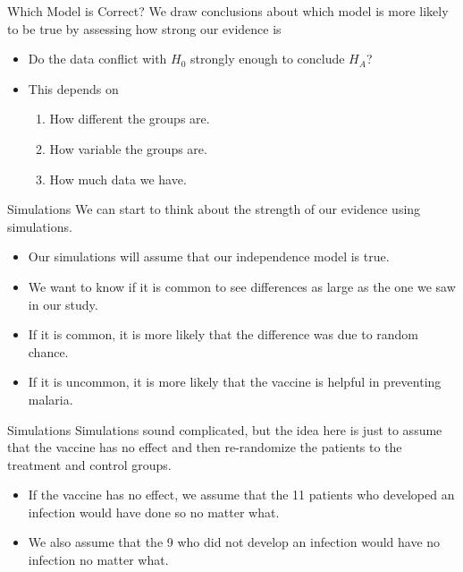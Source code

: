 \begin{frame}{Which Model is Correct?}
    We draw conclusions about which model is more likely to be true by assessing how strong our evidence is
    \begin{itemize}
        \item Do the data conflict with $H_0$ strongly enough to conclude $H_A$?
        \item This depends on
        \begin{enumerate}
            \item How different the groups are.
            \item How variable the groups are.
            \item How much data we have.
        \end{enumerate}
    \end{itemize}
\end{frame}

\begin{frame}{Simulations}
    We can start to think about the strength of our evidence using simulations.
    \begin{itemize}
        \item Our simulations will assume that our independence model is true.
        \item We want to know if it is common to see differences as large as the one we saw in our study.
        \item If it is common, it is more likely that the difference was due to random chance.
        \item If it is uncommon, it is more likely that the vaccine is helpful in preventing malaria.
    \end{itemize}
\end{frame}

\begin{frame}{Simulations}
    Simulations sound complicated, but the idea here is just to assume that the vaccine has no effect and then re-randomize the patients to the treatment and control groups.
    \begin{itemize}
        \item If the vaccine has no effect, we assume that the 11 patients who developed an infection would have done so no matter what. 
        \item We also assume that the 9 who did not develop an infection would have no infection no matter what.
    \end{itemize}
\end{frame}

